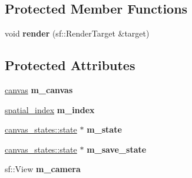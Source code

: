 \subsection*{Protected Member Functions}
\begin{DoxyCompactItemize}
\item 
\hypertarget{classophidian_1_1gui_1_1circuit__canvas_aef2d748763e62d92739886f24f3619da}{void {\bfseries render} (sf\-::\-Render\-Target \&target)}\label{classophidian_1_1gui_1_1circuit__canvas_aef2d748763e62d92739886f24f3619da}

\end{DoxyCompactItemize}
\subsection*{Protected Attributes}
\begin{DoxyCompactItemize}
\item 
\hypertarget{classophidian_1_1gui_1_1circuit__canvas_a26b38d27626a042636ecd0bdb3a0a04f}{\hyperlink{classophidian_1_1gui_1_1canvas}{canvas} {\bfseries m\-\_\-canvas}}\label{classophidian_1_1gui_1_1circuit__canvas_a26b38d27626a042636ecd0bdb3a0a04f}

\item 
\hypertarget{classophidian_1_1gui_1_1circuit__canvas_ad96c2d814a7f996ce114f6d97effe564}{\hyperlink{classophidian_1_1gui_1_1spatial__index}{spatial\-\_\-index} {\bfseries m\-\_\-index}}\label{classophidian_1_1gui_1_1circuit__canvas_ad96c2d814a7f996ce114f6d97effe564}

\item 
\hypertarget{classophidian_1_1gui_1_1circuit__canvas_a237ddadb2ad73420a2202415e671d9f3}{\hyperlink{classophidian_1_1gui_1_1canvas__states_1_1state}{canvas\-\_\-states\-::state} $\ast$ {\bfseries m\-\_\-state}}\label{classophidian_1_1gui_1_1circuit__canvas_a237ddadb2ad73420a2202415e671d9f3}

\item 
\hypertarget{classophidian_1_1gui_1_1circuit__canvas_a15becb02a5cc8d6f2cddce540e02439a}{\hyperlink{classophidian_1_1gui_1_1canvas__states_1_1state}{canvas\-\_\-states\-::state} $\ast$ {\bfseries m\-\_\-save\-\_\-state}}\label{classophidian_1_1gui_1_1circuit__canvas_a15becb02a5cc8d6f2cddce540e02439a}

\item 
\hypertarget{classophidian_1_1gui_1_1circuit__canvas_afb4ed8ed58b5150383f99802a768a3f0}{sf\-::\-View {\bfseries m\-\_\-camera}}\label{classophidian_1_1gui_1_1circuit__canvas_afb4ed8ed58b5150383f99802a768a3f0}


\end{DoxyCompactItemize}
